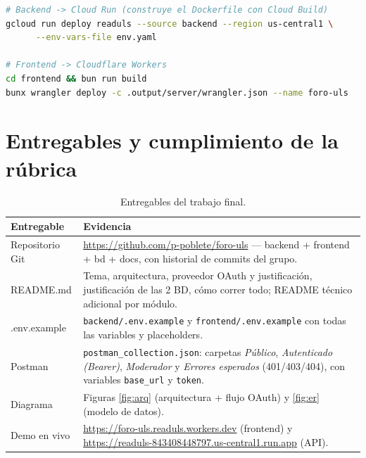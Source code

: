 \documentclass{article}
\newcommand{\repoUrl}{https://github.com/p-poblete/foro-uls}
\newcommand{\frontUrl}{https://foro-uls.readuls.workers.dev}
\newcommand{\apiUrl}{https://readuls-843408448797.us-central1.run.app}
\begin{document}
\begin{lstlisting}[language=bash,caption={Comandos de despliegue}]
# Backend -> Cloud Run (construye el Dockerfile con Cloud Build)
gcloud run deploy readuls --source backend --region us-central1 \
      --env-vars-file env.yaml

# Frontend -> Cloudflare Workers
cd frontend && bun run build
bunx wrangler deploy -c .output/server/wrangler.json --name foro-uls
\end{lstlisting}

\section{Entregables y cumplimiento de la rúbrica}

\begin{table}[H]
\setlength{\tabcolsep}{0.4em}
{\renewcommand{\arraystretch}{1.25}
\footnotesize
\begin{tabular}{|p{3.2cm}|p{11.4cm}|}
    \hline
    \rowcolor{tablebackground}
    \color{white}\textbf{Entregable} & \color{white}\textbf{Evidencia} \\
    \hline
    Repositorio Git & \url{\repoUrl} — backend + frontend + bd + docs, con historial de commits del grupo. \\
    \hline
    README.md & Tema, arquitectura, proveedor OAuth y justificación, justificación de las 2 BD, cómo correr todo; README técnico adicional por módulo. \\
    \hline
    .env.example & \texttt{backend/.env.example} y \texttt{frontend/.env.example} con todas las variables y placeholders. \\
    \hline
    Postman & \texttt{postman\_collection.json}: carpetas \textit{Público}, \textit{Autenticado (Bearer)}, \textit{Moderador} y \textit{Errores esperados} (401/403/404), con variables \texttt{base\_url} y \texttt{token}. \\
    \hline
    Diagrama & Figuras \ref{fig:arq} (arquitectura + flujo OAuth) y \ref{fig:er} (modelo de datos). \\
    \hline
    Demo en vivo & \url{\frontUrl} (frontend) y \url{\apiUrl} (API). \\
    \hline
\end{tabular}}
\caption{Entregables del trabajo final.}
\end{table}
\end{document}

